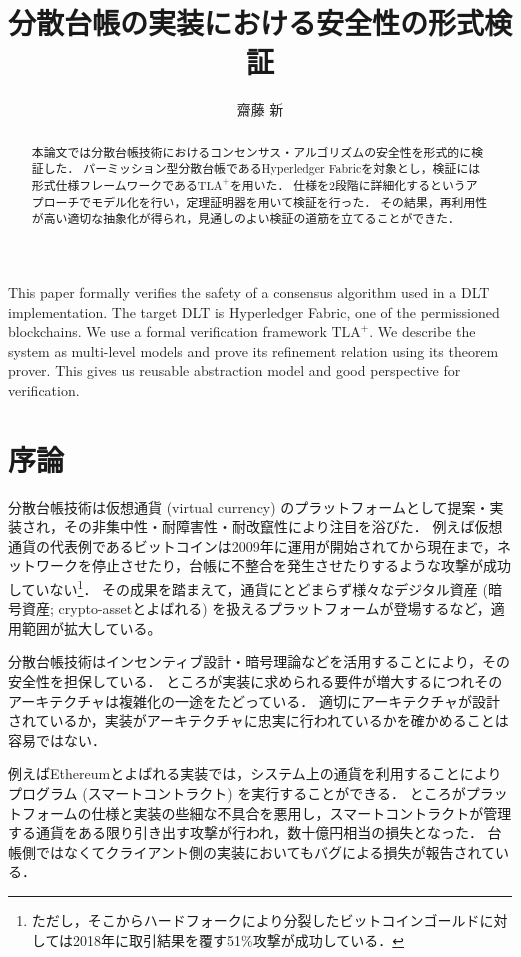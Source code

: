 \documentclass{fose2019}           %
\title{分散台帳の実装における安全性の形式検証}
\author{齋藤 新}{Shin Saito, IBM Research--Tokyo}
\newcommand{\TLA}{$\text{TLA}^{+}$}
\begin{document}
\maketitle

\begin{abstract}
本論文では分散台帳技術におけるコンセンサス・アルゴリズムの安全性を形式的に検証した．
パーミッション型分散台帳であるHyperledger Fabricを対象とし，検証には形式仕様フレームワークである\TLA を用いた．
仕様を2段階に詳細化するというアプローチでモデル化を行い，定理証明器を用いて検証を行った．
その結果，再利用性が高い適切な抽象化が得られ，見通しのよい検証の道筋を立てることができた．
\end{abstract}
\begin{eabstract}
This paper formally verifies the safety of a consensus algorithm used in a DLT implementation.
The target DLT is Hyperledger Fabric, one of the permissioned blockchains.
We use a formal verification framework \TLA.
We describe the system as multi-level models and prove its refinement relation using its theorem prover.
This gives us reusable abstraction model and good perspective for verification.
\end{eabstract}

\section{序論}

分散台帳技術は仮想通貨 (virtual currency) のプラットフォームとして提案・実装され，その非集中性・耐障害性・耐改竄性により注目を浴びた．
例えば仮想通貨の代表例であるビットコイン\cite{nakamoto:bitcoin}は2009年に運用が開始されてから現在まで，ネットワークを停止させたり，台帳に不整合を発生させたりするような攻撃が成功していない\footnote{ただし，そこからハードフォークにより分裂したビットコインゴールドに対しては2018年に取引結果を覆す51\%攻撃が成功している．}．
その成果を踏まえて，通貨にとどまらず様々なデジタル資産 (暗号資産; crypto-assetとよばれる) を扱えるプラットフォーム\cite{ethereum}が登場するなど，適用範囲が拡大している。

分散台帳技術はインセンティブ設計・暗号理論などを活用することにより，その安全性を担保している．
ところが実装に求められる要件が増大するにつれそのアーキテクチャは複雑化の一途をたどっている．
適切にアーキテクチャが設計されているか，実装がアーキテクチャに忠実に行われているかを確かめることは容易ではない．

例えばEthereumとよばれる実装では，システム上の通貨を利用することによりプログラム (スマートコントラクト) を実行することができる．
ところがプラットフォームの仕様と実装の些細な不具合を悪用し，スマートコントラクトが管理する通貨をある限り引き出す攻撃が行われ，数十億円相当の損失となった\cite{dao:codetour}．
台帳側ではなくてクライアント側の実装においてもバグによる損失が報告されている．
\end{document}
